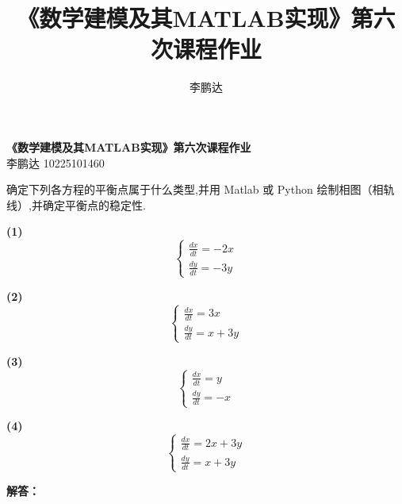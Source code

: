 \documentclass{article}
\begin{document}
\newcommand{\titem}[1]{
~\\
\begin{itemize}
    \item \heiti \large {#1}
\end{itemize}
}

\newcommand{\bb}[1]{{\heiti {#1}}}

\renewcommand{\d}{\mathrm{d}}

\newcommand{\cf}[1]{$^{#1}\textrm{C}$}

\title{《数学建模及其MATLAB实现》第六次课程作业}
\author{李鹏达}
    

\begin{center}
    \LARGE \textbf{\heiti 《数学建模及其{\timesfont MATLAB}实现》第六次课程作业} \\[0.5em]
    \large 李鹏达 10225101460
\end{center}

确定下列各方程的平衡点属于什么类型,并用 Matlab 或 Python 绘制相图（相轨线）,并确定平衡点的稳定性.

\begin{multicols}{2}
    \noindent
    \textbf{(1)} 
    \[
    \begin{cases}
    \frac{dx}{dt} = -2x \\
    \frac{dy}{dt} = -3y
    \end{cases}
    \]

    \noindent
    \textbf{(2)} 
    \[
    \begin{cases}
    \frac{dx}{dt} = 3x \\
    \frac{dy}{dt} = x + 3y
    \end{cases}
    \]

    \columnbreak

    \noindent
    \textbf{(3)} 
    \[
    \begin{cases}
    \frac{dx}{dt} = y \\
    \frac{dy}{dt} = -x
    \end{cases}
    \]

    \noindent
    \textbf{(4)} 
    \[
    \begin{cases}
    \frac{dx}{dt} = 2x + 3y \\
    \frac{dy}{dt} = x + 3y
    \end{cases}
    \]
\end{multicols}

\noindent\textbf{{\heiti 解答：}}
\end{document}
